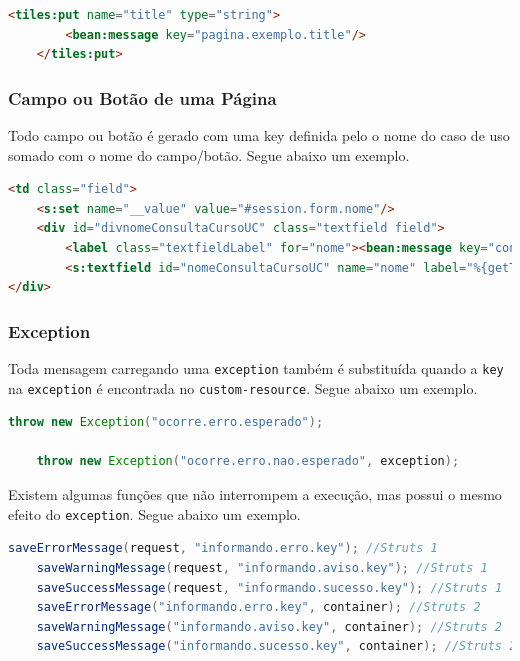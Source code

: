\begin{lstlisting}[language=html, frame=single, breaklines=true]
	<tiles:put name="title" type="string">
    	<bean:message key="pagina.exemplo.title"/>
	</tiles:put>
\end{lstlisting}

\subsubsection{Campo ou Botão de uma Página}

Todo campo ou botão é gerado com uma key definida pelo o nome do caso de uso
somado com o nome do campo/botão. Segue abaixo um exemplo.

\begin{lstlisting}[language=html, frame=single, breaklines=true]
	<td class="field">
	<s:set name="__value" value="#session.form.nome"/>
	<div id="divnomeConsultaCursoUC" class="textfield field">
    	<label class="textfieldLabel" for="nome"><bean:message key="consulta.curso.uc.preencha.campos.consulta.curso.param.nome"/></label>
    	<s:textfield id="nomeConsultaCursoUC" name="nome" label="%{getText('consulta.curso.uc.preencha.campos.consulta.curso.param.nome')}" value="%{#session.form.nome}" title="" styleId="consultaCursoNome" />
</div>
\end{lstlisting}

\subsubsection{Exception}

Toda mensagem carregando uma \texttt{exception} também é substituída quando a
\texttt{key} na \texttt{exception} é encontrada no \texttt{custom-resource}.
Segue abaixo um exemplo.

\begin{lstlisting}[language=java, frame=single, breaklines=true]
	throw new Exception("ocorre.erro.esperado");

	throw new Exception("ocorre.erro.nao.esperado", exception);
\end{lstlisting}

Existem algumas funções que não interrompem a execução, mas possui o mesmo
efeito do \texttt{exception}. Segue abaixo um exemplo.

\begin{lstlisting}[language=java, frame=single, breaklines=true]
	saveErrorMessage(request, "informando.erro.key"); //Struts 1
	saveWarningMessage(request, "informando.aviso.key"); //Struts 1
	saveSuccessMessage(request, "informando.sucesso.key"); //Struts 1
	saveErrorMessage("informando.erro.key", container); //Struts 2
	saveWarningMessage("informando.aviso.key", container); //Struts 2
	saveSuccessMessage("informando.sucesso.key", container); //Struts 2
\end{lstlisting}

